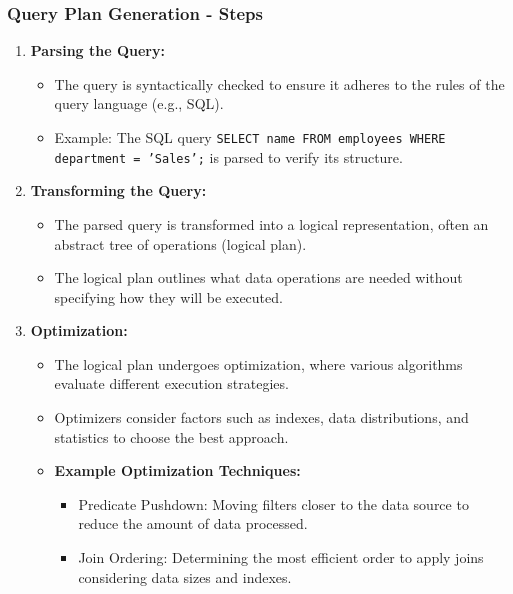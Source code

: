 \documentclass[aspectratio=169]{beamer}
\begin{document}
\begin{frame}[fragile]
    \frametitle{Query Plan Generation - Steps}
    \begin{enumerate}
        \item \textbf{Parsing the Query:}
            \begin{itemize}
                \item The query is syntactically checked to ensure it adheres to the rules of the query language (e.g., SQL).
                \item Example: The SQL query \texttt{SELECT name FROM employees WHERE department = 'Sales';} is parsed to verify its structure.
            \end{itemize}

        \item \textbf{Transforming the Query:}
            \begin{itemize}
                \item The parsed query is transformed into a logical representation, often an abstract tree of operations (logical plan).
                \item The logical plan outlines what data operations are needed without specifying how they will be executed.
            \end{itemize}

        \item \textbf{Optimization:}
            \begin{itemize}
                \item The logical plan undergoes optimization, where various algorithms evaluate different execution strategies.
                \item Optimizers consider factors such as indexes, data distributions, and statistics to choose the best approach.
                \item \textbf{Example Optimization Techniques:}
                    \begin{itemize}
                        \item Predicate Pushdown: Moving filters closer to the data source to reduce the amount of data processed.
                        \item Join Ordering: Determining the most efficient order to apply joins considering data sizes and indexes.
                    \end{itemize}
            \end{itemize}
    \end{enumerate}
\end{frame}
\end{document}
